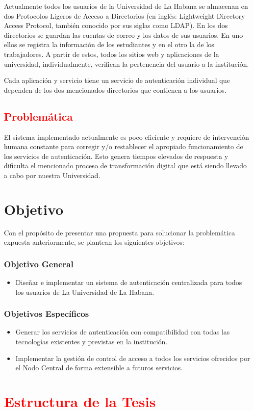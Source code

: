 Actualmente todos los usuarios de la Universidad de La Habana se almacenan en dos Protocolos Ligeros de Acceso a Directorios (en inglés: Lightweight Directory Access Protocol, también conocido por sus siglas como LDAP). En los dos directorios se guardan las cuentas de correo y los datos de sus usuarios. En uno ellos se registra la información de los estudiantes y en el otro la de los trabajadores. A partir de estos, todos los sitios web y aplicaciones de la universidad, individualmente, verifican la pertenencia del usuario a la institución.

Cada aplicación y servicio tiene un servicio de autenticación individual que dependen de los dos mencionados directorios que contienen a los usuarios.

\textcolor{red}{ \section*{Problemática}}
El sistema implementado actualmente es poco eficiente y requiere de intervención humana constante para corregir y/o restablecer el apropiado funcionamiento de los servicios de autenticación. Esto genera tiempos elevados de respuesta y dificulta el mencionado proceso de transformación digital que está siendo llevado a cabo por nuestra Universidad.

\section*{Objetivo}
Con el propósito de presentar una propuesta para solucionar la problemática expuesta anteriormente, se plantean los siguientes objetivos:

\subsubsection*{Objetivo General}

\begin{itemize}	
	\item Diseñar e implementar un sistema de autenticación centralizada para todos los usuarios de La Universidad de La Habana. 
\end{itemize}

\subsubsection*{Objetivos Específicos}
\begin{itemize}	
	\item Generar los servicios de autenticación con compatibilidad con todas las tecnologías existentes y previstas en la institución.
	\item Implementar la gestión de control de acceso a todos los servicios ofrecidos por el Nodo Central de forma extensible a futuros servicios.
\end{itemize}

\section*{\textcolor{red}{Estructura de la Tesis}}